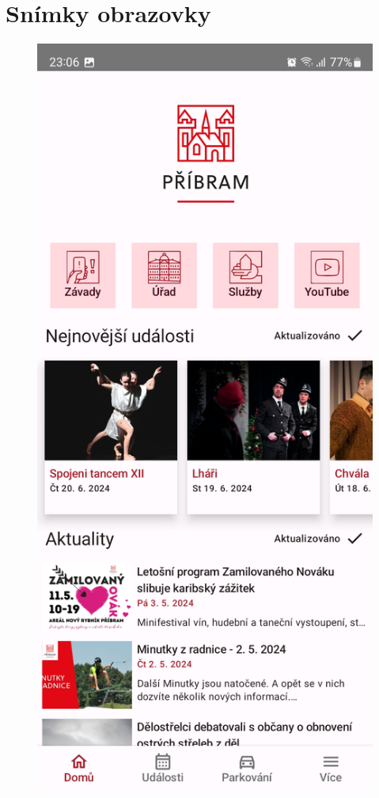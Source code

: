 \chapter{Snímky obrazovky}

\begin{figure}[H]
    \includegraphics[width=\linewidth]{screens/1a_W.jpg}

\end{figure}
